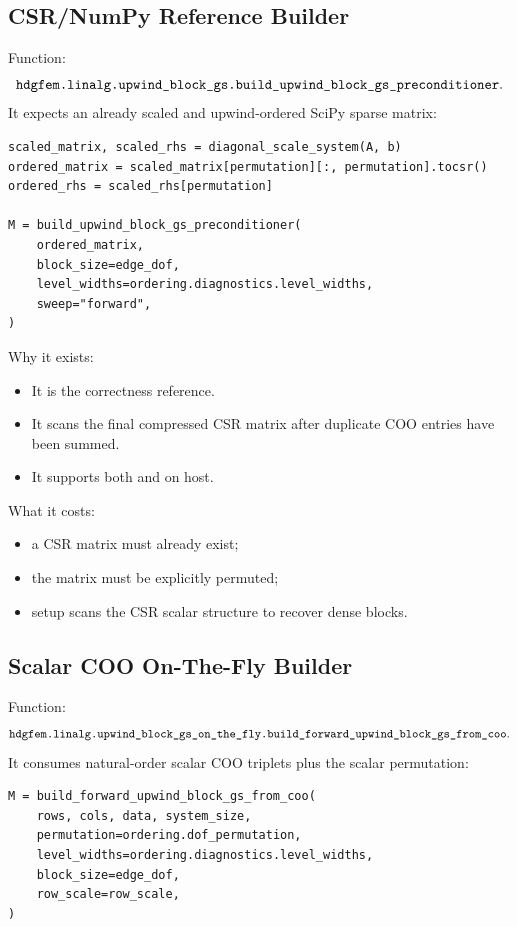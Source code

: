 \documentclass[11pt]{article}
\newcommand{\code}[1]{\texttt{\detokenize{#1}}}
\begin{document}
\subsection{CSR/NumPy Reference Builder}

Function:
\[
  \code{hdgfem.linalg.upwind_block_gs.build_upwind_block_gs_preconditioner}.
\]
It expects an already scaled and upwind-ordered SciPy sparse matrix:
\begin{lstlisting}
scaled_matrix, scaled_rhs = diagonal_scale_system(A, b)
ordered_matrix = scaled_matrix[permutation][:, permutation].tocsr()
ordered_rhs = scaled_rhs[permutation]

M = build_upwind_block_gs_preconditioner(
    ordered_matrix,
    block_size=edge_dof,
    level_widths=ordering.diagnostics.level_widths,
    sweep="forward",
)
\end{lstlisting}

Why it exists:
\begin{itemize}[nosep]
  \item It is the correctness reference.
  \item It scans the final compressed CSR matrix after duplicate COO entries
        have been summed.
  \item It supports both \code{forward} and \code{forward_backward} on host.
\end{itemize}

What it costs:
\begin{itemize}[nosep]
  \item a CSR matrix must already exist;
  \item the matrix must be explicitly permuted;
  \item setup scans the CSR scalar structure to recover dense blocks.
\end{itemize}

\subsection{Scalar COO On-The-Fly Builder}

Function:
\[
  \code{hdgfem.linalg.upwind_block_gs_on_the_fly.build_forward_upwind_block_gs_from_coo}.
\]
It consumes natural-order scalar COO triplets plus the scalar permutation:
\begin{lstlisting}
M = build_forward_upwind_block_gs_from_coo(
    rows, cols, data, system_size,
    permutation=ordering.dof_permutation,
    level_widths=ordering.diagnostics.level_widths,
    block_size=edge_dof,
    row_scale=row_scale,
)
\end{lstlisting}
\end{document}

